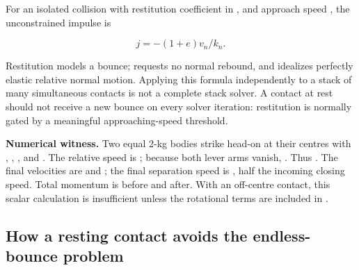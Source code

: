 For an isolated collision with restitution coefficient  in \BookInlineCode{{{[}}{0}{,}{1}{{]}}}{{[}0,1{]}}, and approach speed , the unconstrained impulse is

\[
j=-(1+e)v_n/k_n.
\]

Restitution models a bounce;  requests no normal rebound, and  idealizes perfectly elastic relative normal motion. Applying this formula independently to a stack of many simultaneous contacts is not a complete stack solver. A contact at rest should not receive a new bounce on every solver iteration: restitution is normally gated by a meaningful approaching-speed threshold.

\textbf{Numerical witness.} Two equal 2-kg bodies strike head-on at their centres with , , , and . The relative speed is ; because both lever arms vanish, . Thus . The final velocities are  and ; the final separation speed is , half the incoming closing speed. Total momentum is  before and  after. With an off-centre contact, this scalar calculation is insufficient unless the rotational terms are included in .

\subsection{How a resting contact avoids the endless-bounce problem}\label{06-engine-ii-ch033-how-a-resting-contact-avoids-the-endless-bounce-problem}

\hypertarget{06-engine-ii-ch033-how-a-resting-contact-avoids-the-endless-bounce-problem}{}

